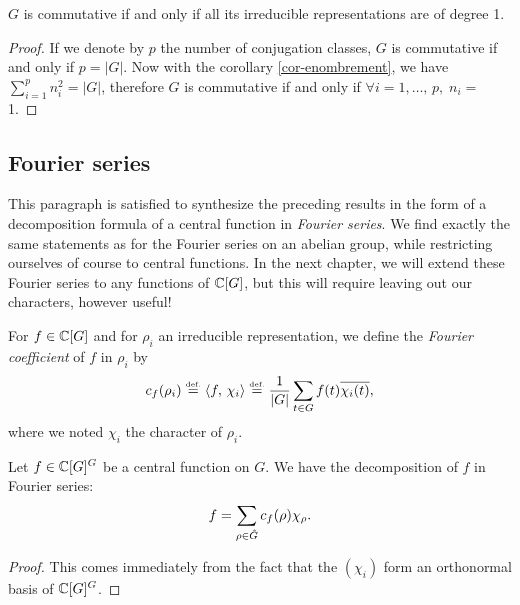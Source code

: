  
\begin{cor}
\label{cor-representations-commutative-grpes}
$G$ is commutative if and only if all its irreducible representations are of degree 1.
\end{cor}
\begin{proof}
If we denote by $ p $ the number of conjugation classes, $G$ is commutative if and only if $ p = |G| $. Now with the corollary \ref{cor-enombrement}, we have $ \sum_{i = 1}^{p}{n_i^2} = |G| $, therefore $G$ is commutative if and only if $ \forall i = 1, \ldots, \, p, \; n_i = $ 1.
\end{proof}
 
\subsection{Fourier series}
\label{sect2-series-fourier}
 
 
This paragraph is satisfied to synthesize the preceding results in the form of a decomposition formula of a central function in \textit{Fourier series}. We find exactly the same statements as for the Fourier series on an abelian group, while restricting ourselves of course to central functions. In the next chapter, we will extend these Fourier series to any functions of $ \mathbb{C} [G] $, but this will require leaving out our characters, however useful!
 
 
 
 
\begin{defn}
\label{notation-94}  For $ f \in \mathbb{C} [G] $ and for $ \rho_i $ an irreducible representation, we define the \textit{Fourier coefficient} of $ f $ in $ \rho_i $ by
\begin{equation}
\label{defn-coef-fourier-grpe-non-commutative}
c_{f} (\rho_i) \stackrel{\mbox{\upshape\tiny def.}}{=} \langle f,\,\chi_i\rangle \stackrel{\mbox{\upshape\tiny def.}}{=} \frac{1}{|G|} \sum_{t \in G}{f(t) \overline{\chi_i ( t)}},
\end{equation}
where we noted $ \chi_i $ the character of $ \rho_i $.
\end{defn}
 
 
\begin{prop}
 Let $ f \in \mathbb{C} [G]^G $ be a central function on $G$. We have the decomposition of $ f $ in Fourier series:
\begin{equation*}
f = \sum_{\rho \in \hat{G}}{c_{f} (\rho) \chi_{\rho}}.
\end{equation*}
\end{prop}
\begin{proof}
This comes immediately from the fact that the $ (\chi_i) $ form an orthonormal basis of $ \mathbb{C} [G]^G $.
\end{proof}
 
